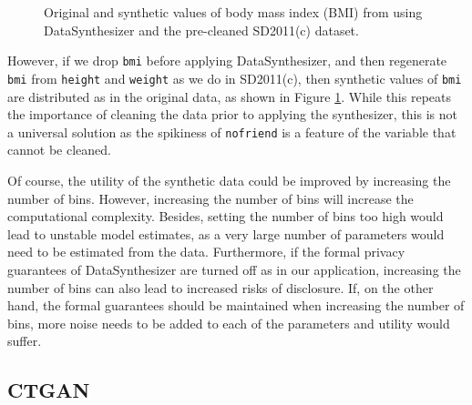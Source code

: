\documentclass[runningheads]{llncs}
\begin{document}
\begin{figure}[t]
    \centering        
    
    \caption{Original and synthetic values of body mass index (BMI) from using DataSynthesizer and the pre-cleaned SD2011(c) dataset.}
    \label{fig:compare_ds_bmi}
    \vspace{-2em}
\end{figure}

However, if we drop \texttt{bmi} before applying DataSynthesizer, and then regenerate \texttt{bmi} from \texttt{height} and \texttt{weight} as we do in SD2011(c), then synthetic values of \texttt{bmi} are  distributed as in the original data, as shown in Figure \ref{fig:compare_ds_bmi}.  While this repeats the importance of cleaning the data prior to applying the synthesizer, this is not a universal solution as the spikiness of \texttt{nofriend} is a feature of the variable that cannot be cleaned.

Of course, the utility of the synthetic data could be improved by increasing the number of bins. However, increasing the number of bins will increase the computational complexity. Besides, setting the number of bins too high would lead to unstable model estimates, as a very large number of parameters would need to be estimated from the data. Furthermore, if the formal privacy guarantees of DataSynthesizer are turned off as in our application, increasing the number of bins can also lead to increased risks of disclosure. If, on the other hand, the formal guarantees should be maintained when increasing the number of bins, more noise needs to be added to each of the parameters and utility would suffer.


\subsection{CTGAN} 
\end{document}
